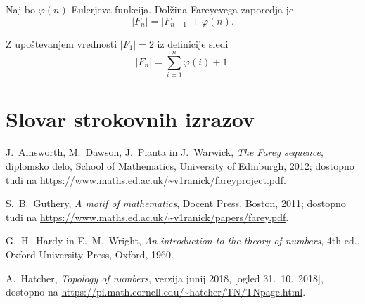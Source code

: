 \documentclass[mat1]{fmfdelo}
\begin{document}
\begin{definicija}
Naj bo $\varphi(n)$ Eulerjeva funkcija. Dolžina Fareyevega zaporedja je
\[  |F_{n}| = |F_{n-1}| + \varphi(n). \]
\end{definicija}

\begin{opomba}
Z upoštevanjem vrednosti $|F_{1}| = 2$ iz definicije sledi \[  |F_{n}| = \sum_{i=1}^n \varphi(i) + 1. \]
\end{opomba}


\section*{Slovar strokovnih izrazov}

\geslo{}{}
\geslo{}{}

\begin{thebibliography}{99}

 J.~Ainsworth, M.~Dawson, J.~Pianta in J.~Warwick, \emph{The Farey sequence}, diplomsko delo, School of Mathematics, University of Edinburgh, 2012; dostopno tudi na \url{https://www.maths.ed.ac.uk/~v1ranick/fareyproject.pdf}.

 S.~B.~Guthery, \emph{A motif of mathematics}, Docent Press, Boston, 2011; dostopno tudi na \url{https://www.maths.ed.ac.uk/~v1ranick/papers/farey.pdf}.

 G.~H.~Hardy in E.~M.~Wright, \emph{An introduction to the theory of numbers}, 4th ed., Oxford University Press, Oxford, 1960.

 A.~Hatcher, \emph{Topology of numbers}, verzija junij 2018, [ogled 31.~10.~2018], dostopno na \url{https://pi.math.cornell.edu/~hatcher/TN/TNpage.html}.

\end{thebibliography}
\end{document}
